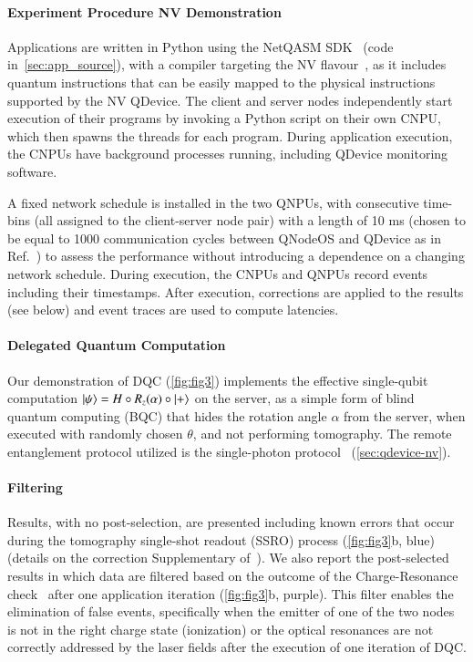 \paragraph{Experiment Procedure NV Demonstration}

Applications are written in Python using the NetQASM SDK~\cite{dahlberg_2022_netqasm} (code in~\cref{sec:app_source}), with a compiler targeting the NV flavour~\cite{dahlberg_2022_netqasm}, as it includes quantum instructions that can be easily mapped to the physical instructions supported by the NV QDevice. The client and server nodes independently start execution of their programs by invoking a Python script on their own CNPU, which then spawns the threads for each program. During application execution, the CNPUs have background processes running, including QDevice monitoring software.

A fixed network schedule is installed in the two QNPUs, with consecutive time-bins (all assigned to the client-server node pair) with a length of 10 ms (chosen to be equal to 1000 communication cycles between QNodeOS and QDevice as in Ref.~\cite{pompili_2022_experimental}) to assess the performance without introducing a dependence on a changing network schedule.  During execution, the CNPUs and QNPUs record events including their timestamps. After execution, corrections are applied to the results (see below) and event traces are used to compute latencies.

\paragraph{Delegated Quantum Computation}

Our demonstration of DQC (\cref{fig:fig3}) implements the effective single-qubit computation $\ket{\psi} = H \circ R_z(\alpha) \circ \ket{+}$ on the server, as a simple form of blind quantum computing (BQC) that hides the rotation angle $\alpha$ from the server, when executed with randomly chosen $\theta$, and not performing tomography. The remote entanglement protocol utilized is the single-photon protocol~\cite{cabrillo1999creation,bose1999proposal,hermans2023entangling} (\cref{sec:qdevice-nv}).

\paragraph{Filtering}

Results, with no post-selection, are presented including known errors that occur during the tomography single-shot readout (SSRO) process (\cref{fig:fig3}b, blue) (details on the correction Supplementary of~\cite{pompili_2021_multinode}). We also report the post-selected results in which data are filtered based on the outcome of the Charge-Resonance check~\cite{robledo2010control} after one application iteration (\cref{fig:fig3}b, purple). This filter enables the elimination of false events, specifically when the emitter of one of the two nodes is not in the right charge state (ionization) or the optical resonances are not correctly addressed by the laser fields after the execution of one iteration of DQC.

